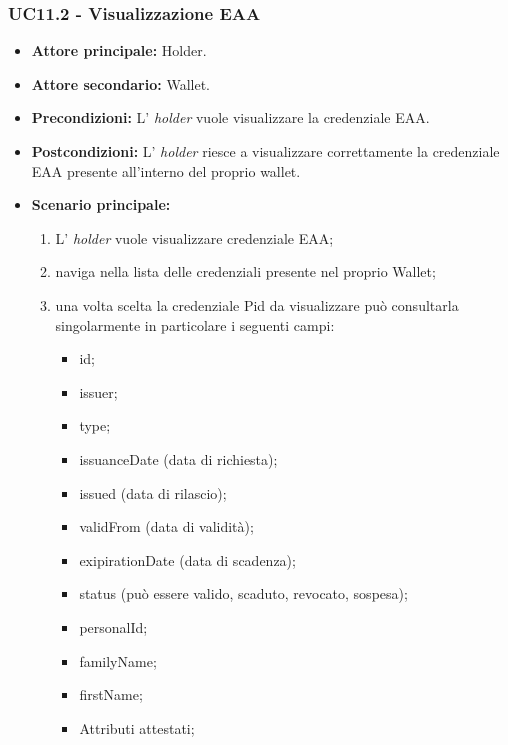 \subsubsection{UC11.2 - Visualizzazione EAA}
\begin{itemize}
\item \textbf{Attore principale:} Holder.
\item \textbf{Attore secondario:} Wallet.
\item \textbf{Precondizioni:} L’ \textit{holder} vuole visualizzare la credenziale EAA.
\item \textbf{Postcondizioni:} L’ \textit{holder} riesce a visualizzare correttamente la credenziale EAA presente all'interno del proprio wallet.
\item \textbf{Scenario principale:} 
    \begin{enumerate}
        \item L' \textit{holder} vuole visualizzare credenziale EAA; 
        \item naviga nella lista delle credenziali presente nel proprio Wallet;
        \item una volta scelta la credenziale Pid da visualizzare può consultarla singolarmente in particolare i seguenti campi:
        \begin{itemize}
            \item id;
            \item issuer;
            \item type;
            \item issuanceDate (data di richiesta);
            \item issued (data di rilascio);
            \item validFrom (data di validità);
            \item exipirationDate (data di scadenza);
            \item status (può essere valido, scaduto, revocato, sospesa);
            \item personalId;
            \item familyName;
            \item firstName;
            \item Attributi attestati;
        \end{itemize}
    \end{enumerate}
\end{itemize}


